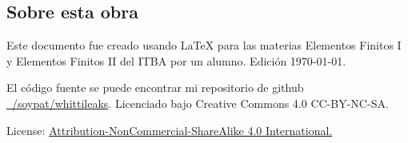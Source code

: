 



	
	\frontmatter %
	
	
	\tableofcontents %
	
	\clearpage
	\vspace{1cm}
	
	\subsection*{Sobre esta obra}
	Este documento fue creado usando \LaTeX{} para las materias Elementos Finitos I y Elementos Finitos II del ITBA por un alumno. Edición \today.
	
	El código fuente se puede encontrar mi repositorio de github \href{https://github.com/soypat/whittileaks}{~/soypat/whittileaks}. Licenciado bajo Creative Commons 4.0 CC-BY-NC-SA.
	
	License: \href{https://creativecommons.org/licenses/by-nc-sa/4.0/}{Attribution-NonCommercial-ShareAlike 4.0 International.}
	
	\lstlistoflistings %
	
	\mainmatter %
	
	\setcounter{section}{-1}
	
	
	
	
	
	
	
	
	
	\clearpage

